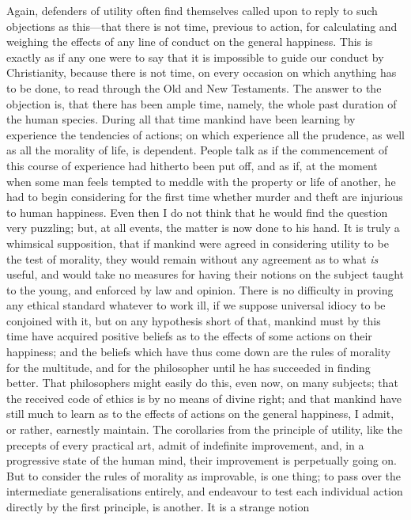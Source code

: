 Again, defenders of utility often find themselves called upon to reply
to such objections as this---that there is not time, previous to
action, for calculating and weighing the effects of any line of
conduct on the general happiness. This is exactly as if any one were
to say that it is impossible to guide our conduct by Christianity,
because there is not time, on every occasion on which anything has to
be done, to read through the Old and New Testaments. The answer to the
objection is, that there has been ample time, namely, the whole past
duration of the human species. During all that time mankind have been
learning by experience the tendencies of actions; on which experience
all the prudence, as well as all the morality of life, is dependent.
People talk as if the commencement of this course of experience had
hitherto been put off, and as if, at the moment when some man feels
tempted to meddle with the property or life of another, he had to
begin considering for the first time whether murder and theft are
injurious to human happiness. Even then I do not think that he would
find the  question very puzzling; but, at all events, the
matter is now done to his hand. It is truly a whimsical supposition,
that if mankind were agreed in considering utility to be the test of
morality, they would remain without any agreement as to what
\textit{is} useful, and would take no measures for having their
notions on the subject taught to the young, and enforced by law and
opinion. There is no difficulty in proving any ethical standard
whatever to work ill, if we suppose universal idiocy to be conjoined
with it, but on any hypothesis short of that, mankind must by this
time have acquired positive beliefs as to the effects of some actions
on their happiness; and the beliefs which have thus come down are the
rules of morality for the multitude, and for the philosopher until he
has succeeded in finding better. That philosophers might easily do
this, even now, on many subjects; that the received code of ethics is
by no means of divine right; and that mankind have still much to learn
as to the effects of actions on the general happiness, I admit, or
rather, earnestly maintain. The corollaries from the principle of
utility, like the precepts of every practical art, admit of indefinite
improvement, and, in a progressive state of the human mind, their
improvement is perpetually going on. But to consider the rules of
morality as improvable, is one thing; to pass over the intermediate
generalisations entirely, and endeavour to test each individual action
directly by the first principle, is another. It is a strange notion
